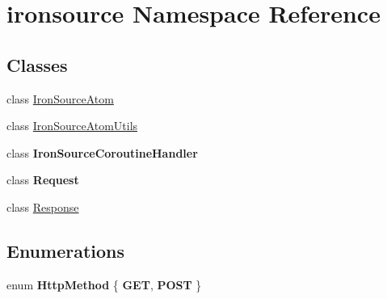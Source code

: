 \hypertarget{namespaceironsource}{}\section{ironsource Namespace Reference}
\label{namespaceironsource}
\subsection*{Classes}
\begin{DoxyCompactItemize}
\item 
class \hyperlink{classironsource_1_1_iron_source_atom}{Iron\+Source\+Atom}
\item 
class \hyperlink{classironsource_1_1_iron_source_atom_utils}{Iron\+Source\+Atom\+Utils}
\item 
class {\bfseries Iron\+Source\+Coroutine\+Handler}
\item 
class {\bfseries Request}
\item 
class \hyperlink{classironsource_1_1_response}{Response}
\end{DoxyCompactItemize}
\subsection*{Enumerations}
\begin{DoxyCompactItemize}
\item 
enum {\bfseries Http\+Method} \{ {\bfseries G\+ET}, 
{\bfseries P\+O\+ST}
 \}\hypertarget{namespaceironsource_a0523ac59824d3a83adc90e1da07c287f}{}\label{namespaceironsource_a0523ac59824d3a83adc90e1da07c287f}

\end{DoxyCompactItemize}
